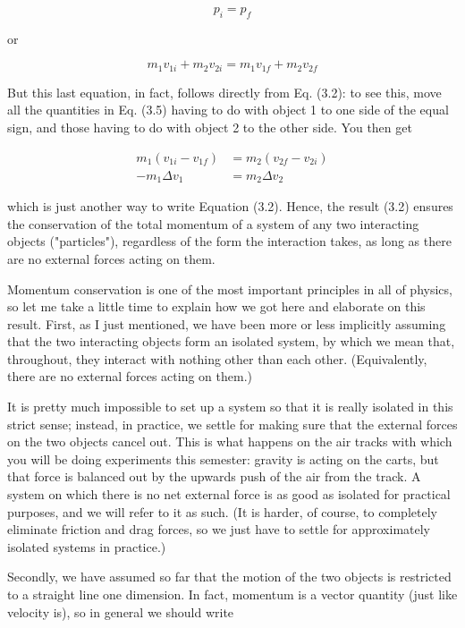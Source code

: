 \documentclass[10pt]{article}
\begin{document}
\begin{equation*}
p_{i}=p_{f} \tag{3.4}
\end{equation*}


or


\begin{equation*}
m_{1} v_{1 i}+m_{2} v_{2 i}=m_{1} v_{1 f}+m_{2} v_{2 f} \tag{3.5}
\end{equation*}


But this last equation, in fact, follows directly from Eq. (3.2): to see this, move all the quantities in Eq. (3.5) having to do with object 1 to one side of the equal sign, and those having to do with object 2 to the other side. You then get


\begin{align*}
m_{1}\left(v_{1 i}-v_{1 f}\right) & =m_{2}\left(v_{2 f}-v_{2 i}\right) \\
-m_{1} \Delta v_{1} & =m_{2} \Delta v_{2} \tag{3.6}
\end{align*}


which is just another way to write Equation (3.2). Hence, the result (3.2) ensures the conservation of the total momentum of a system of any two interacting objects ("particles"), regardless of the form the interaction takes, as long as there are no external forces acting on them.

Momentum conservation is one of the most important principles in all of physics, so let me take a little time to explain how we got here and elaborate on this result. First, as I just mentioned, we have been more or less implicitly assuming that the two interacting objects form an isolated system, by which we mean that, throughout, they interact with nothing other than each other. (Equivalently, there are no external forces acting on them.)

It is pretty much impossible to set up a system so that it is really isolated in this strict sense; instead, in practice, we settle for making sure that the external forces on the two objects cancel out. This is what happens on the air tracks with which you will be doing experiments this semester: gravity is acting on the carts, but that force is balanced out by the upwards push of the air from the track. A system on which there is no net external force is as good as isolated for practical purposes, and we will refer to it as such. (It is harder, of course, to completely eliminate friction and drag forces, so we just have to settle for approximately isolated systems in practice.)

Secondly, we have assumed so far that the motion of the two objects is restricted to a straight line one dimension. In fact, momentum is a vector quantity (just like velocity is), so in general we should write
\end{document}

